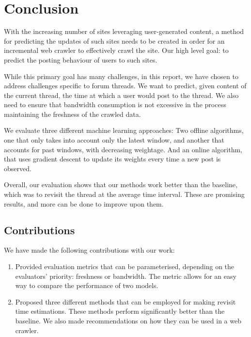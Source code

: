 \chapter{Conclusion}

With the increasing number of sites leveraging user-generated content, a method 
for predicting the updates of such sites needs to be created in order for an 
incremental web crawler to effectively crawl the site. Our high level goal: to 
predict the posting behaviour of users to such sites.

While this primary goal has many challenges, in this report, we have chosen to 
address challenges specific to forum threads. We want to predict, given content 
of the current thread, the time at which a user would post to the thread. We 
also need to ensure that bandwidth consumption is not excessive in the process 
maintaining the freshness of the crawled data.

We evaluate three different machine learning approaches: Two offline algorithms, 
one that only takes into account only the latest window, and another that 
accounts for past windows, with decreasing weightage. And an online algorithm, 
that uses gradient descent to update its weights every time a new post is 
observed.

Overall, our evaluation shows that our methods work better than the baseline, 
which was to revisit the thread at the average time interval. These are 
promising results, and more can be done to improve upon them. 

\section{Contributions}
We have made the following contributions with our work:
\begin{enumerate}
	\item Provided evaluation metrics that can be parameterised, depending on 
the evaluators' priority: freshness or bandwidth. The metric allows for an easy 
way to compare the performance of two models.

	\item Proposed three different methods that can be employed for making 
revisit time estimations. These methods perform significantly better than the 
baseline.  We also made recommendations on how they can be used in a web 
crawler.
\end{enumerate}

